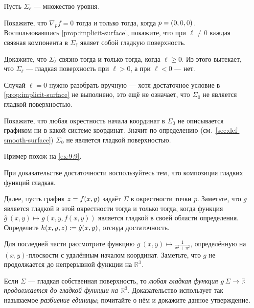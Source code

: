 
\setcounter{eqtn}{0}

Пусть $\Sigma_\ell$ --- множество уровня.

Покажите, что $\nabla_p f=0$ тогда и только тогда, когда $p\z=(0,0,0)$.
Воспользовавшись \ref{prop:implicit-surface}, покажите, что при $\ell\ne 0$ каждая связная компонента в $\Sigma_\ell$ являет собой гладкую поверхность.

Докажите, что $\Sigma_\ell$ связно тогда и только тогда, когда $\ell\ge 0$.
Из этого вытекает, что $\Sigma_\ell$ --- гладкая поверхность при $\ell>0$, а при $\ell<0$ --- нет.

Случай $\ell=0$ нужно разобрать вручную --- хотя достаточное условие в \ref{prop:implicit-surface} не выполнено, это ещё не означает, что $\Sigma_0$ не является гладкой поверхностью.

Покажите, что любая окрестность начала координат в $\Sigma_0$ не описывается графиком ни в какой системе координат.
Значит по определению (см.~\ref{sec:def-smooth-surface}) $\Sigma_0$ не является гладкой поверхностью.

Пример похож на \ref{ex:9:9}.

При доказательстве достаточности воспользуйтесь тем, что композиция гладких функций гладкая.

Далее, пусть график $z\z=f(x,y)$ задаёт $\Sigma$ в окрестности точки $p$.
Заметьте, что $g$ является гладкой в этой окрестности тогда и только тогда, когда функция $\hat g\:(x,y)\mapsto g(x,y,f(x,y))$ является гладкой в своей области определения.
Определите $h(x,y,z)\z\df \hat g(x,y)$, отсюда достаточность.

Для последней части рассмотрите функцию $g\:(x,y)\mapsto\tfrac1{x^2+y^2}$, определённую на $(x,y)$-плоскости с удалённым началом координат.
Заметьте, что $g$ не продолжается до непрерывной функции на $\mathbb{R}^3$.

Если $\Sigma$ --- гладкая собственная поверхность,
то \textit{любая гладкая функция $g\:\Sigma\to\mathbb{R}$ продолжается до гладкой функции на $\mathbb{R}^3$}.
Доказательство использует так называемое \emph{разбиение единицы};
почитайте о нём и докажите данное утверждение.

